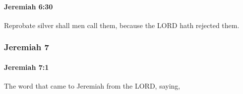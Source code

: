 		\paragraph{Jeremiah 6:30} %
			\label{JEREMIAH-6-30}

			Reprobate silver shall men call them, because the LORD hath rejected them.

	\subsubsection{Jeremiah 7} %
		\label{JEREMIAH-7}

		\paragraph{Jeremiah 7:1} %
			\label{JEREMIAH-7-1}

			The word that came to Jeremiah from the LORD, saying,

